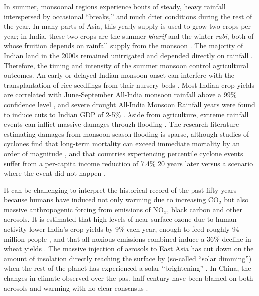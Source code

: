 	In summer, monsoonal regions experience bouts of steady, heavy rainfall interspersed by occasional ``breaks,'' and much drier conditions during the rest of the year. In many parts of Asia, this yearly supply is used to grow two crops per year; in India, these two crops are the summer \textit{kharif} and the winter \textit{rabi}, both of whose fruition depends on rainfall supply from the monsoon \citep{Gadgil2006a}. The majority of Indian land in the 2000s remained unirrigated and depended directly on rainfall \citep{KrishnaKumar2004}. Therefore, the timing and intensity of the summer monsoon control agricultural outcomes. An early or delayed Indian monsoon onset can interfere with the transplantation of rice seedlings from their nursery beds \citep{Gadgil2006a}. Most Indian crop yields are correlated with June-September All-India monsoon rainfall above a 99\% confidence level \citep{KrishnaKumar2004}, and severe drought All-India Monsoon Rainfall years were found to induce cuts to Indian GDP of 2-5\% \citep{Gadgil2006}. Aside from agriculture, extreme rainfall events can inflict massive damages through flooding \citep{Li2012}. The research literature estimating damages from monsoon-season flooding is sparse, although studies of cyclones find that long-term mortality can exceed immediate mortality by an order of magnitude \citep{Anttila-Hughes2012}, and that countries experiencing  percentile cyclone events  suffer from a per-capita income reduction of 7.4\% 20 years later versus a scenario where the event did not happen \citep{Hsiang2014}.
	
	It can be challenging to interpret the historical record of the past fifty years because humans have induced not only warming due to increasing CO$_2$ but also massive anthropogenic forcing from emissions of NO$_x$, black carbon and other aerosols. It is estimated that high levels of near-surface ozone due to human activity lower India's crop yields by 9\% each year, enough to feed roughly 94 million people \citep{Ghude2014}, and that all noxious emissions combined induce a 36\% decline in wheat yields \citep{Burney2014}. The massive injection of aerosols to East Asia has cut down on the amount of insolation directly reaching the surface by (so-called ``solar dimming'') when the rest of the planet has experienced a solar ``brightening'' \citep{Norris2009}. In China, the changes in climate observed over the past half-century have been blamed on both aerosols and warming with no clear consensus \citep{Menon2002,Yang2015,Yu2016,Yang2016}.
	
